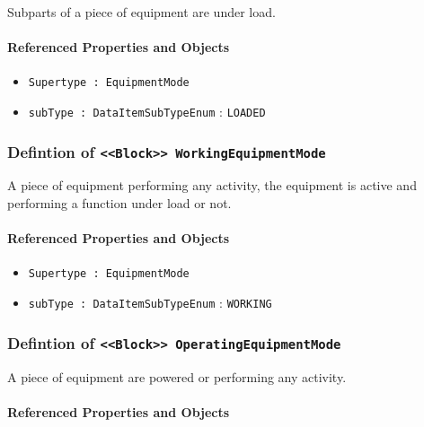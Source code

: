 \FloatBarrier

Subparts of a piece of equipment are under load.

\FloatBarrier
\paragraph{Referenced Properties and Objects}

\begin{itemize}
\item \texttt{Supertype : EquipmentMode}

\item \texttt{subType : DataItemSubTypeEnum} : \texttt{LOADED}

\end{itemize}
\FloatBarrier
\subsubsection{Defintion of \texttt{<<Block>> WorkingEquipmentMode}}
  \label{type:WorkingEquipmentMode}

\FloatBarrier

A piece of equipment performing any activity, the equipment is active and performing a function under load or not.

\FloatBarrier
\paragraph{Referenced Properties and Objects}

\begin{itemize}
\item \texttt{Supertype : EquipmentMode}

\item \texttt{subType : DataItemSubTypeEnum} : \texttt{WORKING}

\end{itemize}
\FloatBarrier
\subsubsection{Defintion of \texttt{<<Block>> OperatingEquipmentMode}}
  \label{type:OperatingEquipmentMode}

\FloatBarrier

A piece of equipment are powered or performing any activity.

\FloatBarrier
\paragraph{Referenced Properties and Objects}


